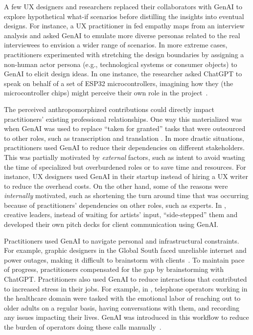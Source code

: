 A few UX designers and researchers replaced their collaborators with GenAI to explore hypothetical what-if scenarios before distilling the insights into eventual designs. For instance, a UX practitioner in \cite{21} fed empathy maps from an interview analysis and asked GenAI to emulate more diverse personas related to the real interviewees to envision a wider range of scenarios. 
In more extreme cases, practitioners experimented with stretching the design boundaries by assigning a non-human actor persona (e.g., technological systems or consumer objects) to GenAI to elicit design ideas. In one instance, the researcher asked ChatGPT to speak on behalf of a set of ESP32 microcontrollers, imagining how they (the microcontroller chips) might perceive their own role in the project~\cite{21}.

The perceived anthropomorphized contributions could directly impact practitioners' existing professional relationships. One way this materialized was when GenAI was used to replace ``taken for granted'' tasks that were outsourced to other roles, such as transcription and translation \cite{1}. In more drastic situations, practitioners used GenAI to reduce their dependencies on different stakeholders. This was partially motivated by \textit{external} factors, such as intent to avoid wasting the time of specialized but overburdened roles or to save time and resources. For instance, UX designers used GenAI in their startup \cite{2} instead of hiring a UX writer to reduce the overhead costs. On the other hand, some of the reasons were \textit{internally} motivated, such as shortening the turn around time that was occurring because of practitioners' dependencies on other roles, such as experts. In \cite{9}, creative leaders, instead of waiting for artists' input, ``side-stepped'' them and developed their own pitch decks for client communication using GenAI. 

Practitioners used GenAI to navigate personal and infrastructural constraints. For example, graphic designers in the Global South faced unreliable internet and power outages, making it difficult to brainstorm with clients~\cite{14}. To maintain pace of progress, practitioners compensated for the gap by brainstorming with ChatGPT. Practitioners also used GenAI to reduce interactions that contributed to increased stress in their jobs. For example, in \cite{5}, telephone operators working in the healthcare domain were tasked with the emotional labor of reaching out to older adults on a regular basis, having conversations with them, and recording any issues impacting their lives. GenAI was introduced in this workflow to reduce the burden of operators doing these calls manually~\cite{5}.


